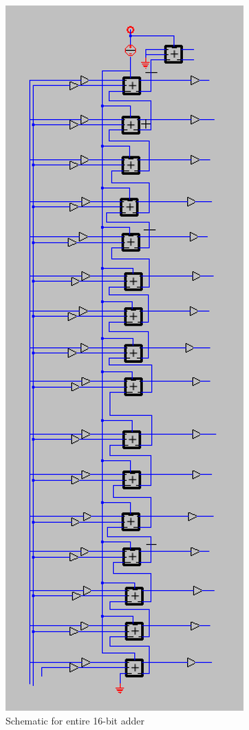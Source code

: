 \documentclass{article}
\begin{document}
\begin{figure}[H]
  \includegraphics[width=\linewidth]{opt_screenshots/opt_16b_adder_sch.png}
  \caption{Schematic for entire 16-bit adder}
  \label{fig:opt_16b_adder_sch}
\end{figure}
\end{document}
